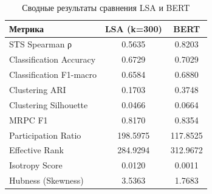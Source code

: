 \begin{table}[htbp]
\centering
\caption{Сводные результаты сравнения LSA и BERT}
\label{tab:results}
\begin{tabular}{lcc}
\toprule
Метрика & LSA (k=300) & BERT \\
\midrule
STS Spearman ρ & 0.5635 & 0.8203 \\
Classification Accuracy & 0.6729 & 0.7029 \\
Classification F1-macro & 0.6584 & 0.6880 \\
Clustering ARI & 0.1703 & 0.3748 \\
Clustering Silhouette & 0.0466 & 0.0664 \\
MRPC F1 & 0.8170 & 0.8354 \\
Participation Ratio & 198.5975 & 117.8525 \\
Effective Rank & 284.9294 & 312.9672 \\
Isotropy Score & 0.0120 & 0.0011 \\
Hubness (Skewness) & 3.5363 & 1.7683 \\
\bottomrule
\end{tabular}
\end{table}

